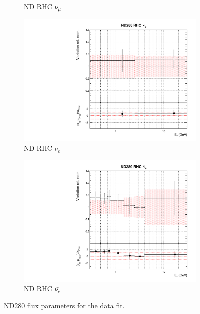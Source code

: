 \begin{figure}[!htbp]
\begin{subfigure}{0.45\textwidth}
  \caption{ND RHC $\bar{\nu_{\mu}}$}
\end{subfigure}
\begin{subfigure}{0.45\textwidth}
  \centering
  \includegraphics[width=0.75\linewidth]{figs/datflux6}
  \caption{ND RHC $\nu_{e}$}
\end{subfigure}
\begin{subfigure}{0.45\textwidth}
  \centering
  \includegraphics[width=0.75\linewidth]{figs/datflux7}
  \caption{ND RHC $\bar{\nu_e}$}
\end{subfigure}
\caption{ND280 flux parameters for the data fit.}
\label{fig:datfluxND}
\end{figure}

